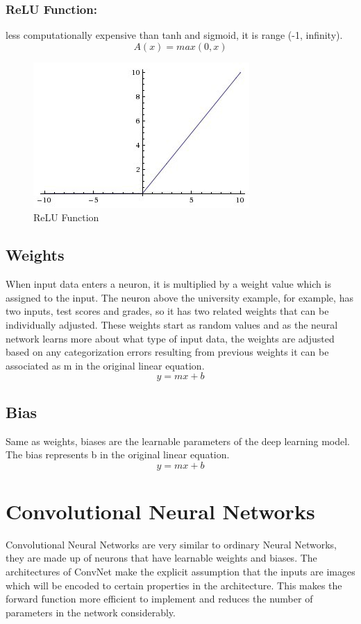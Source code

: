 \documentclass[12pt]{report}
\begin{document}
\subsubsection{ReLU Function:}
less computationally expensive than tanh and sigmoid, it is range (-1, infinity).
$$ A(x) = max(0,x) $$

\begin{figure} [h]
    \centering
    \includegraphics[width=.5\textwidth]{./images/relu.jpeg}
    \caption{ReLU Function}
    \label{fig:relu}
\end{figure}

\subsection{Weights}
When input data enters a neuron, it is multiplied by a weight value 
which is assigned to the input. The neuron above the university example, 
for example, has two inputs, test scores and grades, so it has two related
weights that can be individually adjusted.
These weights start as random values and as the neural network learns more 
about what type of input data, the weights are adjusted based on any categorization
errors resulting from previous weights it can be associated as m in the original 
linear equation.
$$ y = mx + b$$


\subsection{Bias}
Same as weights, biases are the learnable parameters of the deep learning model.
The bias represents b in the original linear equation.
$$ y = mx + b $$

\section{Convolutional Neural Networks}
Convolutional Neural Networks are very similar to ordinary Neural Networks, 
they are made up of neurons that have learnable weights and biases.
The architectures of ConvNet make the explicit assumption that 
the inputs are images which will be encoded to certain properties in the architecture. 
This makes the forward function more efficient to implement and reduces the number of 
parameters in the network considerably.
\end{document}
